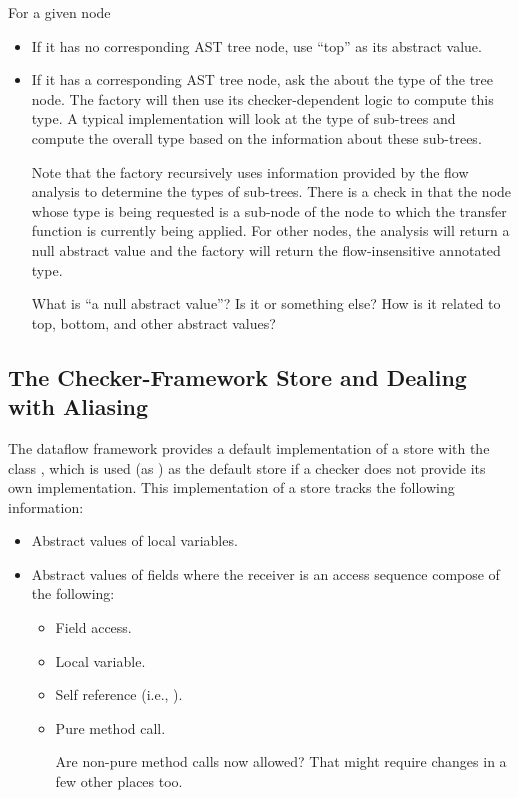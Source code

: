 For a given node 
\begin{itemize}
\item
    If it has no corresponding AST tree node, use ``top'' as its abstract value.
\item
    If it has a corresponding AST tree node, ask the  about
    the type of the tree node.  The factory will then use its checker-dependent logic
    to compute this type.  A typical implementation will look at the type
    of sub-trees and compute the overall type based on the information about these sub-trees.
    
    Note that the factory recursively uses information provided by the flow analysis to determine
    the types of sub-trees.  There is a check in  that the node whose type
    is being requested is a sub-node of the node to which the transfer function is currently being
    applied.  For other nodes, the analysis will return a null abstract value and the factory will
    return the flow-insensitive annotated type.

\begin{workinprogress}
What is ``a null abstract value''?  Is it  or something else?
How is it related to top, bottom, and other abstract values?
\end{workinprogress}

\end{itemize}



\subsection{The Checker-Framework Store and Dealing with Aliasing}

The dataflow framework provides a default implementation of a store with the
class , which is used (as ) as the
default store if a checker does not provide its own implementation.
This implementation of a store tracks the following information:
\begin{itemize}
	\item Abstract values of local variables.
	\item Abstract values of fields where the receiver is an access sequence
	compose of the following:
	\begin{itemize}
	\item Field access.
	\item Local variable.
	\item Self reference (i.e., ).
	\item Pure method call.
\begin{workinprogress}
Are non-pure method calls now allowed?  That might require changes in a few
other places too.
\end{workinprogress}
	\end{itemize}
\end{itemize}

